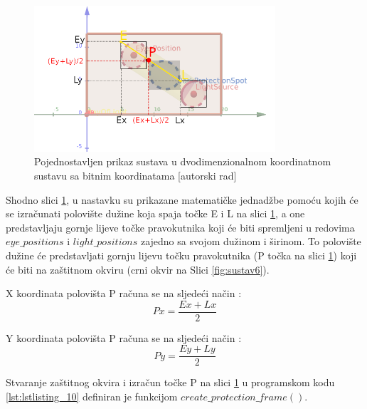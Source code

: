 \documentclass{foi}
\begin{document}
\begin{figure}[h!]
    \centering
    \includegraphics[width=0.8\textwidth]{slike/sustav_coord}
    \caption{Pojednostavljen prikaz sustava u dvodimenzionalnom koordinatnom sustavu sa bitnim koordinatama [autorski rad]}
    \label{fig:sustavCoord}
\end{figure}

    Shodno slici \ref{fig:sustavCoord}, u nastavku su prikazane matematičke jednadžbe pomoću kojih će se izračunati polovište dužine koja spaja točke E i L na slici \ref{fig:sustavCoord}, a one predstavljaju gornje lijeve točke pravokutnika koji će biti spremljeni u redovima  $eye\_positions$ i $light\_positions$ zajedno sa svojom dužinom i širinom. To polovište dužine će predstavljati gornju lijevu točku pravokutnika (P točka na slici \ref{fig:sustavCoord}) koji će biti na zaštitnom okviru (crni okvir na Slici \ref{fig:sustav6}).

\flushleft X koordinata polovišta P računa se na sljedeći način \cite{Edutorij}:
\justifying
\begin{equation*}
Px = \frac{Ex + Lx}{2}
\end{equation*}

\flushleft Y koordinata polovišta P računa se na sljedeći način \cite{Edutorij}:
\justifying
\begin{equation*}
Py = \frac{Ey + Ly}{2}
\end{equation*}

\newpage
Stvaranje zaštitnog okvira i izračun točke P na slici \ref{fig:sustavCoord} u programskom kodu \ref{lst:lstlisting_10} definiran je funkcijom $create\_protection\_frame()$.
\end{document}
